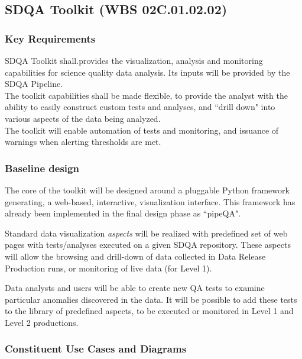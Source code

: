 \documentclass[12pt]{article}
\newcommand{\wbsSDQAT}{WBS 02C.01.02.02}
\begin{document}
\clearpage

\subsection{SDQA Toolkit (\wbsSDQAT)}

\subsubsection{Key Requirements}

SDQA Toolkit shall.provides the visualization, analysis and monitoring capabilities for science quality data analysis. Its inputs will be provided by the SDQA Pipeline.
\\

The toolkit capabilities shall be made flexible, to provide the analyst with the ability to easily construct custom tests and analyses, and ``drill down" into various aspects of the data being analyzed.
\\

The toolkit will enable automation of tests and monitoring, and issuance of warnings when alerting thresholds are met.

\subsubsection{Baseline design}

The core of the toolkit will be designed around a pluggable Python framework generating, a web-based, interactive, visualization interface. This framework has already been implemented in the final design phase as ``pipeQA".

Standard data visualization \emph{aspects} will be realized with predefined set of web pages with tests/analyses executed on a given SDQA repository. These aspects will allow the browsing and drill-down of data collected in Data Release Production runs, or monitoring of live data (for Level 1).

Data analysts and users will be able to create new QA tests to examine particular anomalies discovered in the data. It will be possible to add these tests to the library of predefined aspects, to be executed or monitored in Level 1 and Level 2 productions.

\subsubsection{Constituent Use Cases and Diagrams}
\end{document}
